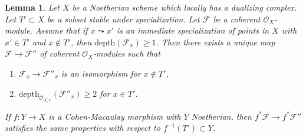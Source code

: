 \documentclass{stacks-project}
\theoremstyle{plain}
\newtheorem{lemma}[subsection]{Lemma}
\theoremstyle{definition}
\theoremstyle{remark}
\numberwithin{equation}{subsection}
\begin{document}
\begin{lemma}
\label{lemma-make-S2-along-T-simple}
Let $X$ be a Noetherian scheme which locally has a dualizing complex.
Let $T' \subset X$ be a subset stable under specialization.
Let $\mathcal{F}$ be a coherent $\mathcal{O}_X$-module.
Assume that if $x \leadsto x'$ is an immediate specialization
of points in $X$ with $x' \in T'$ and $x \not \in T'$, then
$\text{depth}(\mathcal{F}_x) \geq 1$.
Then there exists a unique map $\mathcal{F} \to \mathcal{F}''$
of coherent $\mathcal{O}_X$-modules such that
\begin{enumerate}
\item $\mathcal{F}_x \to \mathcal{F}''_x$ is an isomorphism
for $x \not \in T'$,
\item $\text{depth}_{\mathcal{O}_{X, x}}(\mathcal{F}''_x) \geq 2$
for $x \in T'$.
\end{enumerate}
If $f : Y \to X$ is a Cohen-Macaulay morphism with $Y$ Noetherian,
then $f^*\mathcal{F} \to f^*\mathcal{F}''$ satisfies the same properties
with respect to $f^{-1}(T') \subset Y$.
\end{lemma}
\end{document}
